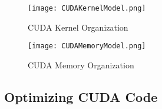 \begin{figure}[h]
    \centering
    \texttt{[image: CUDAKernelModel.png]}
    \caption{CUDA Kernel Organization}
    \label{fig:kernelorganization}
\end{figure}

\begin{figure}[h]
    \centering
    \texttt{[image: CUDAMemoryModel.png]}
    \caption{CUDA Memory Organization}
    \label{fig:cudamemoryorganization}
\end{figure}
\subsection{Optimizing CUDA Code}
